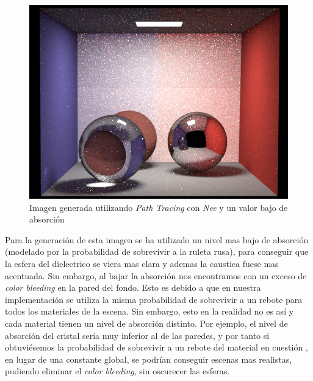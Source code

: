\documentclass[10pt,oneside,a4paper]{article}
\begin{document}
\begin{figure}[h]
\centering
\includegraphics[width=.6\linewidth]{images/cbox_interesting_nee_512.png}
\caption{Imagen generada utilizando \textit{Path Tracing} con \textit{Nee} y un valor bajo de absorción}
\label{fig:disp}
\end{figure}

Para la generación de esta imagen se ha utilizado un nivel mas bajo de absorción (modelado por la probabilidad de sobrevivir a la ruleta rusa), para conseguir que la esfera del dielectrico se viera mas clara y ademas la caustica fuese mas acentuada. Sin embargo, al bajar la absorción nos encontramos con un exceso de \textit{color bleeding} en la pared del fondo. Esto es debido a que en nuestra implementación se utiliza la misma probabilidad de sobrevivir a un rebote para todos los materiales de la escena. Sin embargo, esto en la realidad no es así y cada material tienen un nivel de absorción distinto. Por ejemplo, el nivel de absorción del cristal seria muy inferior al de las paredes, y por tanto si obtuviésemos la probabilidad de sobrevivir a un rebote del material en cuestión , en lugar de una constante global, se podrían conseguir escenas mas realistas, pudiendo eliminar el \textit{color bleeding}, sin oscurecer las esferas.   
  
\end{document}
